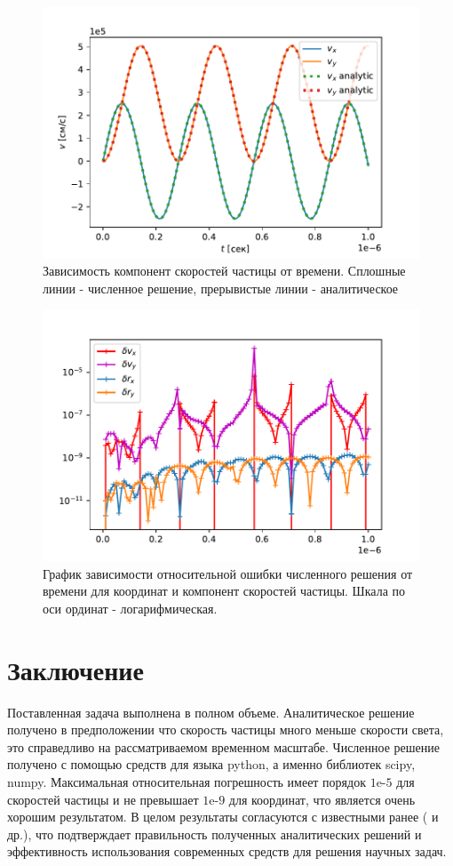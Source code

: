 \documentclass[a4paper]{article}
\begin{document}
\begin{figure}
	\centering
	\includegraphics[width=0.8\linewidth]{plotSpeed.pdf}
	\caption{Зависимость компонент скоростей частицы от времени. Сплошные линии - численное решение, прерывистые линии - аналитическое}
	\label{graph_s}
\end{figure}

\begin{figure}
	\centering
	\includegraphics[width=0.8\linewidth]{plotMistake.pdf}
	\caption{График зависимости относительной ошибки численного решения от времени для координат и компонент скоростей частицы. Шкала по оси ординат - логарифмическая.}
	\label{graph_m}
\end{figure}

\section{Заключение}
Поставленная задача выполнена в полном объеме. Аналитическое решение получено в предположении что скорость частицы много меньше скорости света, это справедливо на рассматриваемом временном масштабе. Численное решение получено с помощью средств для языка python,  а именно библиотек scipy\cite{web:scipy}, numpy\cite{web:numpy}. Максимальная относительная погрешность имеет порядок  $1\text{e-}5$ для скоростей частицы и не превышает $1\text{e-}9$ для координат, что является очень хорошим результатом. В целом результаты согласуются с известными ранее (\cite{Landau:field} и др.), что подтверждает правильность полученных аналитических решений и эффективность использования современных средств для решения научных задач.
\end{document}
